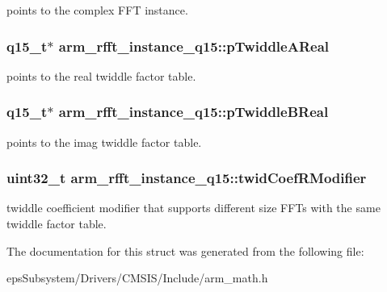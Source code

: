 points to the complex F\-F\-T instance. \hypertarget{structarm__rfft__instance__q15_affbf2de522ac029432d98e8373c0ec53}{
\subsubsection[{p\-Twiddle\-A\-Real}]{\setlength{\rightskip}{0pt plus 5cm}q15\-\_\-t$\ast$ arm\-\_\-rfft\-\_\-instance\-\_\-q15\-::p\-Twiddle\-A\-Real}}\label{structarm__rfft__instance__q15_affbf2de522ac029432d98e8373c0ec53}
points to the real twiddle factor table. \hypertarget{structarm__rfft__instance__q15_a937d815022adc557b435ba8c6cd58b0d}{
\subsubsection[{p\-Twiddle\-B\-Real}]{\setlength{\rightskip}{0pt plus 5cm}q15\-\_\-t$\ast$ arm\-\_\-rfft\-\_\-instance\-\_\-q15\-::p\-Twiddle\-B\-Real}}\label{structarm__rfft__instance__q15_a937d815022adc557b435ba8c6cd58b0d}
points to the imag twiddle factor table. \hypertarget{structarm__rfft__instance__q15_afd444d05858c5f419980e94e8240d5c3}{
\subsubsection[{twid\-Coef\-R\-Modifier}]{\setlength{\rightskip}{0pt plus 5cm}uint32\-\_\-t arm\-\_\-rfft\-\_\-instance\-\_\-q15\-::twid\-Coef\-R\-Modifier}}\label{structarm__rfft__instance__q15_afd444d05858c5f419980e94e8240d5c3}
twiddle coefficient modifier that supports different size F\-F\-Ts with the same twiddle factor table. 

The documentation for this struct was generated from the following file\-:\begin{DoxyCompactItemize}
\item 
eps\-Subsystem/\-Drivers/\-C\-M\-S\-I\-S/\-Include/arm\-\_\-math.\-h\end{DoxyCompactItemize}
